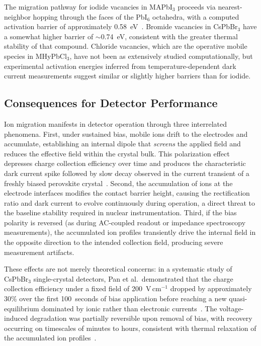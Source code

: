 The migration pathway for iodide vacancies in MAPbI$_3$ proceeds
via nearest-neighbor hopping through the faces of the PbI$_6$
octahedra, with a computed activation barrier of approximately
0.58~eV~\cite{Eames2015}.  Bromide vacancies in CsPbBr$_3$ have a
somewhat higher barrier of $\sim$0.74~eV, consistent with the greater
thermal stability of that compound.  Chloride vacancies, which are the
operative mobile species in MHyPbCl$_3$, have not been as extensively
studied computationally, but experimental activation energies inferred
from temperature-dependent dark current measurements suggest similar
or slightly higher barriers than for iodide.

\subsection{Consequences for Detector Performance}

Ion migration manifests in detector operation through three interrelated
phenomena.  First, under sustained bias, mobile ions drift to the
electrodes and accumulate, establishing an internal dipole that
\emph{screens} the applied field and reduces the effective field within
the crystal bulk.  This polarization effect depresses charge collection
efficiency over time and produces the characteristic dark current spike
followed by slow decay observed in the current transient of a freshly
biased perovskite crystal~\cite{He_NatPhoton_2021}.  Second, the
accumulation of ions at the electrode interfaces modifies the
contact barrier height, causing the rectification ratio and dark current
to evolve continuously during operation, a direct threat to the
baseline stability required in nuclear instrumentation.  Third, if
the bias polarity is reversed (as during AC-coupled readout or
impedance spectroscopy measurements), the accumulated ion profiles
transiently drive the internal field in the opposite direction to the
intended collection field, producing severe measurement artifacts.

These effects are not merely theoretical concerns: in a systematic study
of CsPbBr$_3$ single-crystal detectors, Pan et al.\ demonstrated that
the charge collection efficiency under a fixed field of
200~V\,cm$^{-1}$ dropped by approximately 30\% over the first
100~seconds of bias application before reaching a new quasi-equilibrium
dominated by ionic rather than electronic currents~\cite{Pan2019}.
The voltage-induced degradation was partially reversible upon removal
of bias, with recovery occurring on timescales of minutes to hours,
consistent with thermal relaxation of the accumulated ion
profiles~\cite{Zhao2019}.

